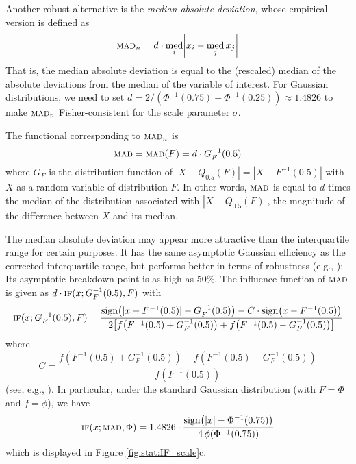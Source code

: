 Another robust alternative is the \emph{median absolute deviation}, whose
empirical version is defined as
\[
    \stsc{MAD}_n = d \cdot \med_i\left|x_i-\med_j x_j\right|
\]
That is, the median absolute deviation is equal to the (rescaled) median of the
absolute deviations from the median of the variable of interest. For Gaussian
distributions, we need to set $d = 2 / \left(\Phi^{-1}(0.75) -
\Phi^{-1}(0.25)\right) \approx 1.4826$ to make $\stsc{MAD}_n$
Fisher-consistent for the scale parameter $\sigma$.

The functional corresponding to $\stsc{MAD}_n$ is 
\[
    \stsc{MAD} = \stsc{MAD}(F) = d \cdot G_{F}^{-1}(0.5)
\]
where $G_{F}$ is the distribution function of $|X-Q_{0.5}(F)| = |X-F^{-1}(0.5)|$ 
with $X$ as a random variable of distribution $F$. In other
words, $\stsc{MAD}$ is equal to $d$ times the median of the distribution
associated with $|X-Q_{0.5}(F)|$, the magnitude of the difference between $X$
and its median.

The median absolute deviation may appear more attractive than the
interquartile range for certain purposes. It has the same asymptotic
Gaussian efficiency as the corrected interquartile range, but performs better
in terms of robustness (e.g., \citealp[p. 1273–1274]{rousseeuw:croux:1993}):
Its asymptotic breakdown point is as high as 50\%. The influence function 
of $\stsc{MAD}$ is given as $d \cdot \stsc{IF}(x; G_{F}^{-1}(0.5), F)$ with
\[
    \stsc{IF}(x; G_{F}^{-1}(0.5), F)
    = \frac{\sign\left(|x-F^{-1}(0.5)| - G_{F}^{-1}(0.5)\right) - C \cdot \sign\left(x-F^{-1}(0.5)\right)}
    {2 \left[f\left(F^{-1}(0.5) + G_{F}^{-1}(0.5)\right) + f\left(F^{-1}(0.5) - G_{F}^{-1}(0.5)\right)\right]}
\]
where
\[
    C = \frac{f\left(F^{-1}(0.5) + G_{F}^{-1}(0.5)\right) - f\left(F^{-1}(0.5) - G_{F}^{-1}(0.5)\right)}
    {f\left(F^{-1}(0.5)\right)}
\]
(see, e.g., \citealp{wilcox:2005}). In particular, under the standard Gaussian
distribution (with $F=\Phi$ and $f=\phi$), we have                              
\[
    \stsc{IF}(x; \stsc{MAD}, \Phi) 
    = 1.4826 \cdot\frac{\sign\left(|x| - \Phi^{-1}(0.75)\right)}
                       {4\,\phi\left(\Phi^{-1}(0.75)\right)}
\]
which is displayed in Figure \ref{fig:stat:IF_scale}c.                          


